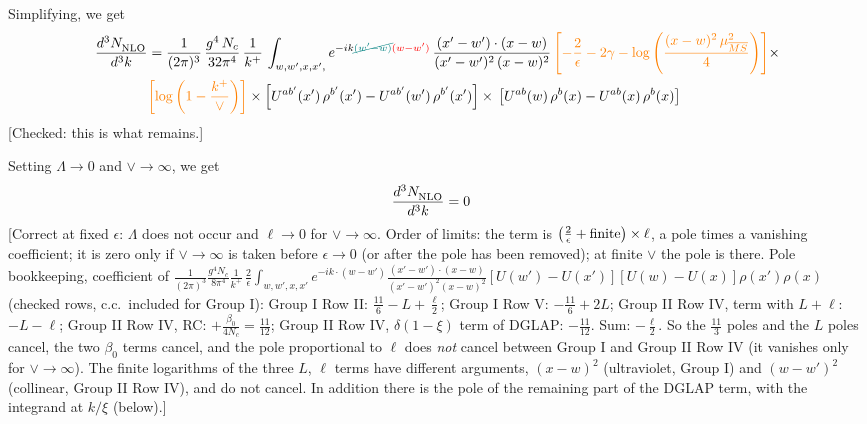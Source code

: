 \documentclass[9pt]{article}
\numberwithin{equation}{section}
\begin{document}
Simplifying, we get
\begin{align}
     \frac{d^{3}N_{\rm NLO}^{\rm}}{d^{3}k} &  =  \frac{1}{(2\pi)^{3}}\, \frac{g^{4}\,N_{c}}{32\pi^{4}}\,\frac{1}{k^{+}}\, \int_{w, w',x,x',} e^{-ik{\color{teal}\cancel{(w^\prime-w)}}{\color{red}(w-w^\prime)}}\, \frac{(x'-w')\cdot (x-w)}{(x'-w')^{2}\, (x-w)^{2}}\, {\color{orange}\left[-\frac{2}{\epsilon}-2\gamma-\log{\left(\frac{(x-w)^{2}\,\mu^{2}_{\overline{MS}}}{4}\right)}\right]}\times \notag \\ & {\color{orange}\left[\log{\left(1-\frac{k^{+}}{\vee}\right)}\right]}\times\left[U^{ab'}(x')\,\rho^{b'}(x') - U^{ab'}(w')\,\rho^{b'}(x')\right]\times\,\left[U^{ab}(w)\,\rho^{b}(x) - U^{ab}(x)\,\rho^{b}(x)\right]
\end{align} {\color{red}[Checked: this is what remains.]}\par\noindent     
Setting $\Lambda \to 0$ and $\vee \to \infty$, we get
\begin{align}
\frac{d^{3}N_{\rm NLO}^{\rm}}{d^{3}k}  & = 0
\end{align} {\color{red}[Correct at fixed $\epsilon$: $\Lambda$ does not occur and $\ell\to0$ for $\vee\to\infty$. Order of limits: the term is $\big(\frac{2}{\epsilon}+{\rm finite}\big)\times\ell$, a pole times a vanishing coefficient; it is zero only if $\vee\to\infty$ is taken before $\epsilon\to0$ (or after the pole has been removed); at finite $\vee$ the pole is there. Pole bookkeeping, coefficient of $\frac{1}{(2\pi)^{3}}\frac{g^{4}N_{c}}{8\pi^{4}}\frac{1}{k^{+}}\,\frac{2}{\epsilon}\int_{w,w',x,x'}e^{-ik\cdot(w-w')}\frac{(x'-w')\cdot(x-w)}{(x'-w')^{2}(x-w)^{2}}[U(w')-U(x')][U(w)-U(x)]\rho(x')\rho(x)$ (checked rows, c.c.\ included for Group I): Group I Row II: $\frac{11}{6}-L+\frac{\ell}{2}$; Group I Row V: $-\frac{11}{6}+2L$; Group II Row IV, term with $L+\ell$: $-L-\ell$; Group II Row IV, RC: $+\frac{\beta_{0}}{4N_{c}}=\frac{11}{12}$; Group II Row IV, $\delta(1-\xi)$ term of DGLAP: $-\frac{11}{12}$. Sum: $-\frac{\ell}{2}$. So the $\frac{11}{3}$ poles and the $L$ poles cancel, the two $\beta_{0}$ terms cancel, and the pole proportional to $\ell$ does \emph{not} cancel between Group I and Group II Row IV (it vanishes only for $\vee\to\infty$). The finite logarithms of the three $L$, $\ell$ terms have different arguments, $(x-w)^{2}$ (ultraviolet, Group I) and $(w-w')^{2}$ (collinear, Group II Row IV), and do not cancel. In addition there is the pole of the remaining part of the DGLAP term, with the integrand at $k/\xi$ (below).]}\par\noindent
\end{document}
